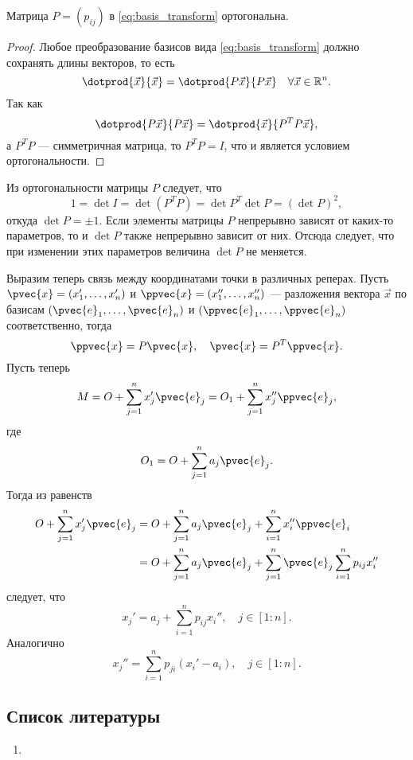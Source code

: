 \begin{theorem}
  Матрица $P = (p_{ij})$ в \autoref{eq:basis_transform} ортогональна.
\end{theorem}

\begin{proof}
  Любое преобразование базисов вида \ref{eq:basis_transform} должно сохранять
  длины векторов, то есть
  \begin{equation*}
    \dotprod{\vec{x}}{\vec{x}} = \dotprod{P \vec{x}}{P \vec{x}} \quad \forall
      \vec{x} \in \mathbb{R}^n .
  \end{equation*}
  Так как
  \begin{equation*}
    \dotprod{P \vec{x}}{P \vec{x}} = \dotprod{\vec{x}}{P^T P \vec{x}},
  \end{equation*}
  а $P^T P$ --- симметричная матрица, то $P^T P = I$, что и является условием
  ортогональности.
\end{proof}

Из ортогональности матрицы $P$ следует, что
\begin{equation*}
  1 = \det I = \det (P^T P) = \det P^T \det P = (\det P)^2,
\end{equation*}
откуда $\det P = \pm 1$. Если элементы матрицы $P$ непрерывно зависят от
каких-то параметров, то и $\det P$ также непрерывно зависит от них. Отсюда
следует, что при изменении этих параметров величина $\det P$ не меняется.

Выразим теперь связь между координатами точки в различных реперах. Пусть
$\pvec{x} = (x_1', \dots, x_n')$ и $\ppvec{x} = (x_1'', \dots, x_n'')$ ---
разложения вектора $\vec{x}$ по базисам $(\pvec{e}_1, \dots, \pvec{e}_n)$ и
$(\ppvec{e}_1, \dots, \ppvec{e}_n)$ соответственно, тогда
\begin{equation*}
  \ppvec{x} = P \pvec{x}, \quad \pvec{x} = P^T \ppvec{x}.
\end{equation*}
Пусть теперь
\begin{equation*}
  M = O + \sum_{j=1}^n x_j' \pvec{e}_j = O_1 + \sum_{j=1}^n x_j'' \ppvec{e}_j,
\end{equation*}
где
\begin{equation*}
  O_1 = O + \sum_{j=1}^n a_j \pvec{e}_j.
\end{equation*}
Тогда из равенств
\begin{equation*}
  \begin{aligned}
    O + \sum_{j=1}^n x_j' \pvec{e}_j &= O + \sum_{j=1}^n a_j \pvec{e}_j +
      \sum_{i=1}^n x_i'' \ppvec{e}_i \\
    &= O + \sum_{j=1}^n a_j \pvec{e}_j +
      \sum_{j=1}^n \pvec{e}_j \sum_{i=1}^n p_{ij} x_i''
  \end{aligned}
\end{equation*}
следует, что
\begin{equation}
  x_j' = a_j + \sum_{i=1}^n p_{ij} x_i'', \quad j \in [1:n].
\end{equation}
Аналогично
\begin{equation}
  x_j'' = \sum_{i=1}^n p_{ji} (x_i' - a_i), \quad j \in [1:n].
\end{equation}

\subsection{Список литературы}
\begin{enumerate}
  \item \cite{lectures}
\end{enumerate}

